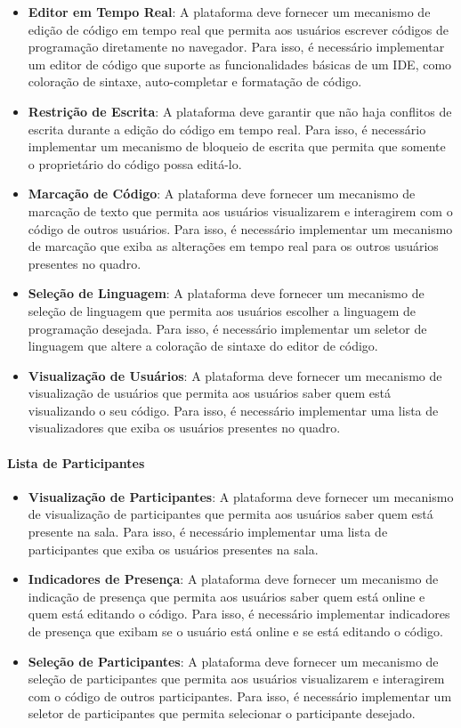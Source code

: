 \begin{itemize}
    \item \textbf{Editor em Tempo Real}: A plataforma deve fornecer um mecanismo de edição de código em tempo real que permita aos usuários escrever códigos de programação diretamente no navegador. Para isso, é necessário implementar um editor de código que suporte as funcionalidades básicas de um IDE, como coloração de sintaxe, auto-completar e formatação de código.
    \item \textbf{Restrição de Escrita}: A plataforma deve garantir que não haja conflitos de escrita durante a edição do código em tempo real. Para isso, é necessário implementar um mecanismo de bloqueio de escrita que permita que somente o proprietário do código possa editá-lo.
    \item \textbf{Marcação de Código}: A plataforma deve fornecer um mecanismo de marcação de texto que permita aos usuários visualizarem e interagirem com o código de outros usuários. Para isso, é necessário implementar um mecanismo de marcação que exiba as alterações em tempo real para os outros usuários presentes no quadro.
    \item \textbf{Seleção de Linguagem}: A plataforma deve fornecer um mecanismo de seleção de linguagem que permita aos usuários escolher a linguagem de programação desejada. Para isso, é necessário implementar um seletor de linguagem que altere a coloração de sintaxe do editor de código.
    \item \textbf{Visualização de Usuários}: A plataforma deve fornecer um mecanismo de visualização de usuários que permita aos usuários saber quem está visualizando o seu código. Para isso, é necessário implementar uma lista de visualizadores que exiba os usuários presentes no quadro.
\end{itemize}

\paragraph{Lista de Participantes}

\begin{itemize}
    \item \textbf{Visualização de Participantes}: A plataforma deve fornecer um mecanismo de visualização de participantes que permita aos usuários saber quem está presente na sala. Para isso, é necessário implementar uma lista de participantes que exiba os usuários presentes na sala.
    \item \textbf{Indicadores de Presença}: A plataforma deve fornecer um mecanismo de indicação de presença que permita aos usuários saber quem está online e quem está editando o código. Para isso, é necessário implementar indicadores de presença que exibam se o usuário está online e se está editando o código.
    \item \textbf{Seleção de Participantes}: A plataforma deve fornecer um mecanismo de seleção de participantes que permita aos usuários visualizarem e interagirem com o código de outros participantes. Para isso, é necessário implementar um seletor de participantes que permita selecionar o participante desejado.
\end{itemize}


